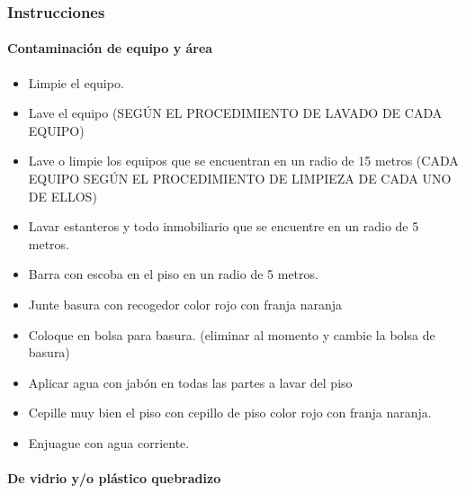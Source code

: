 \subsubsection{Instrucciones}

\paragraph{Contaminación de equipo y área}

\begin{itemize}
	\item Limpie el equipo.
	\item Lave el equipo (SEGÚN EL PROCEDIMIENTO DE LAVADO DE CADA EQUIPO)
	\item Lave o limpie los equipos que se encuentran en un radio de 15 metros (CADA EQUIPO SEGÚN EL PROCEDIMIENTO DE LIMPIEZA DE CADA UNO DE ELLOS)
	\item Lavar estanteros y todo inmobiliario que se encuentre en un radio de 5 metros.
	\item Barra con escoba en el piso en un radio de 5 metros.
	\item Junte basura con recogedor color rojo con franja naranja
	\item Coloque en bolsa para basura. (eliminar al momento y cambie la bolsa de basura)
	\item Aplicar agua con jabón en todas las partes a lavar del piso
	\item Cepille muy bien el piso con cepillo de piso color rojo con franja naranja.
	\item Enjuague con agua corriente.
\end{itemize}

\paragraph{De vidrio y/o plástico quebradizo}

